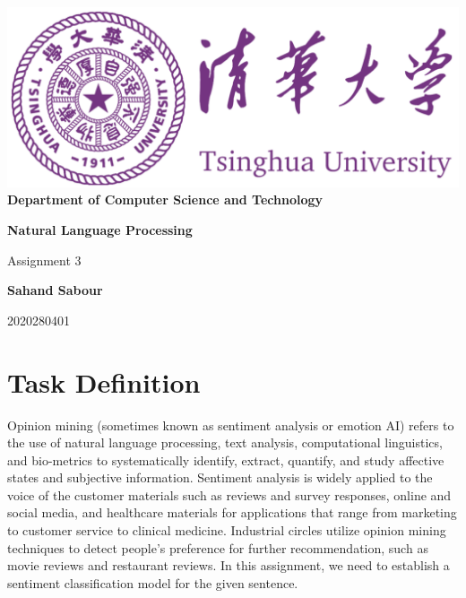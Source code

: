 \documentclass[12pt,a4paper]{article}
\begin{document}
	\begin{titlepage}
		\begin{center}
			\includegraphics[scale=.4]{Figures/Cover}\\
			\vspace{1cm}
			\bf{ \large {Department of Computer Science and Technology} }
		\end{center}
		
		\vspace{4cm}
		\centering
		\textbf{\Huge Natural Language Processing}
		\vspace{.5cm}
		
		{\Large Assignment 3}

		\vspace{4cm}
		
		\textbf{\LARGE Sahand Sabour}
		
		\vspace{0.5cm}
		
		{\large 2020280401}
		
		
		\vfill
		
	\end{titlepage}

	\section{Task Definition}
	Opinion mining (sometimes known as sentiment analysis or emotion AI) refers to the use of natural language processing, text analysis, computational linguistics,
	and bio-metrics to systematically identify, extract, quantify, and study affective
	states and subjective information. Sentiment analysis is widely applied to the
	voice of the customer materials such as reviews and survey responses, online and
	social media, and healthcare materials for applications that range from marketing to customer service to clinical medicine. Industrial circles utilize opinion
	mining techniques to detect people’s preference for further recommendation,
	such as movie reviews and restaurant reviews. In this assignment, we need to
	establish a sentiment classification model for the given sentence.
		
\end{document}
